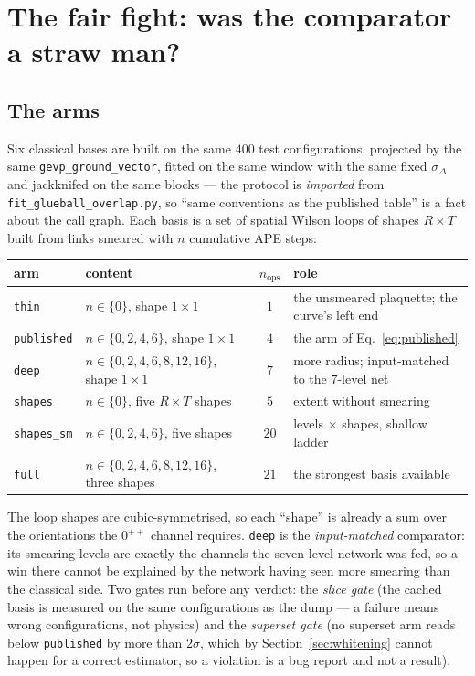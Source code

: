 \documentclass[11pt,a4paper]{article}
\newcommand{\arm}[1]{\texttt{#1}}
\begin{document}
\section{The fair fight: was the comparator a straw man?}
\label{sec:fairfight}

\subsection{The arms}
\label{sec:arms}

Six classical bases are built on the same $400$ test configurations, projected
by the same \texttt{gevp\_ground\_vector}, fitted on the same window with the
same fixed $\sigma_\Delta$ and jackknifed on the same blocks --- the protocol is
\emph{imported} from \texttt{fit\_glueball\_overlap.py}, so ``same conventions
as the published table'' is a fact about the call graph. Each basis is a set of
spatial Wilson loops of shapes $R\times T$ built from links smeared with $n$
cumulative APE steps:

\begin{center}\small
\setlength{\tabcolsep}{4pt}
\begin{tabular}{@{}llcl@{}}
\toprule
arm & content & $n_{\text{ops}}$ & role \\
\midrule
\arm{thin}      & $n \in \{0\}$, shape $1\times1$ & $1$ &
   the unsmeared plaquette; the curve's left end \\
\arm{published} & $n \in \{0,2,4,6\}$, shape $1\times1$ & $4$ &
   the arm of Eq.~\eqref{eq:published} \\
\arm{deep}      & $n \in \{0,2,4,6,8,12,16\}$, shape $1\times1$ & $7$ &
   more radius; input-matched to the $7$-level net \\
\arm{shapes}    & $n \in \{0\}$, five $R\times T$ shapes & $5$ &
   extent without smearing \\
\arm{shapes\_sm}& $n \in \{0,2,4,6\}$, five shapes & $20$ &
   levels $\times$ shapes, shallow ladder \\
\arm{full}      & $n \in \{0,2,4,6,8,12,16\}$, three shapes & $21$ &
   the strongest basis available \\
\bottomrule
\end{tabular}
\end{center}

The loop shapes are cubic-symmetrised, so each ``shape'' is already a sum over
the orientations the $0^{++}$ channel requires. \arm{deep} is the
\emph{input-matched} comparator: its smearing levels are exactly the channels
the seven-level network was fed, so a win there cannot be explained by the
network having seen more smearing than the classical side. Two gates run before
any verdict: the \emph{slice gate} (the cached basis is measured on the same
configurations as the dump --- a failure means wrong configurations, not
physics) and the \emph{superset gate} (no superset arm reads below
\arm{published} by more than $2\sigma$, which by Section~\ref{sec:whitening}
cannot happen for a correct estimator, so a violation is a bug report and not a
result).
\end{document}
